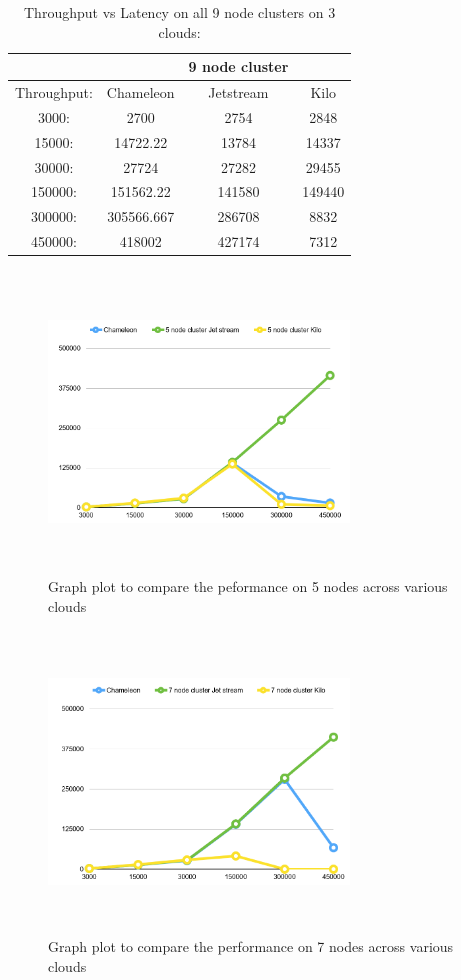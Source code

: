 \documentclass[9pt,twocolumn,twoside]{../../styles/osajnl}
\begin{document}
\begin{table}[!htb]
\centering
\caption{Throughput vs Latency on all 9 node clusters on 3 clouds:}\label{T:bench-9}
\begin{center}
 \begin{tabular}{|c|| c c c|} 
 \hline
  &   &9 node cluster & \\ [0.5ex]
 \hline\hline
 Throughput: & Chameleon & Jetstream & Kilo \\ 
 \hline
 3000: & 2700 & 2754 & 2848 \\
 \hline
 15000: & 14722.22 & 13784 & 14337 \\
 \hline
 30000: & 27724 & 27282 & 29455 \\
 \hline
 150000: & 151562.22& 141580 & 149440 \\
 \hline
 300000: & 305566.667 &286708 & 8832 \\
 \hline
 450000: & 418002 & 427174 & 7312 \\
 \hline
\end{tabular}
\end{center}
\end{table}

\begin{figure}[!htb]
  \includegraphics[width=8cm,height=8cm,keepaspectratio,width=\linewidth]{images/bench2-1.PNG}
  \caption{Graph plot to compare the peformance on 5 nodes across various clouds}
  \label{5c}
\end{figure}

\begin{figure}[!htb]
  \includegraphics[width=8cm,height=8cm,keepaspectratio,width=\linewidth]{images/bench2-2.PNG}
  \caption{Graph plot to compare the performance on 7 nodes across various clouds}
  \label{7c}
\end{figure}
\end{document}
